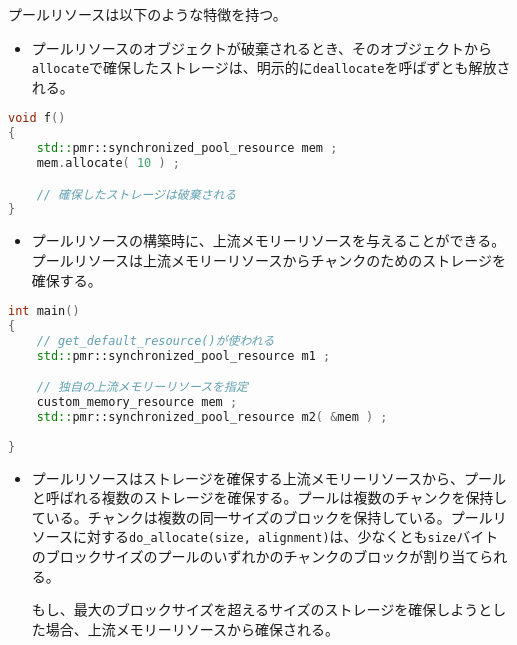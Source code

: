 プールリソースは以下のような特徴を持つ。

\begin{itemize}[leftmargin=*]
\item
  プールリソースのオブジェクトが破棄されるとき、そのオブジェクトから\lstinline!allocate!で確保したストレージは、明示的に\lstinline!deallocate!を呼ばずとも解放される。
\end{itemize}

\begin{lstlisting}[language=C++]
void f()
{
    std::pmr::synchronized_pool_resource mem ;
    mem.allocate( 10 ) ;

    // 確保したストレージは破棄される
}
\end{lstlisting}

\begin{itemize}[leftmargin=*]
\item
  プールリソースの構築時に、上流メモリーリソースを与えることができる。プールリソースは上流メモリーリソースからチャンクのためのストレージを確保する。
\end{itemize}

\begin{lstlisting}[language=C++]
int main()
{
    // get_default_resource()が使われる
    std::pmr::synchronized_pool_resource m1 ;

    // 独自の上流メモリーリソースを指定
    custom_memory_resource mem ;
    std::pmr::synchronized_pool_resource m2( &mem ) ;
    
}
\end{lstlisting}

\begin{itemize}[leftmargin=*]
\item
  プールリソースはストレージを確保する上流メモリーリソースから、プールと呼ばれる複数のストレージを確保する。プールは複数のチャンクを保持している。チャンクは複数の同一サイズのブロックを保持している。プールリソースに対する\lstinline!do_allocate(size, alignment)!は、少なくとも\lstinline!size!バイトのブロックサイズのプールのいずれかのチャンクのブロックが割り当てられる。

  もし、最大のブロックサイズを超えるサイズのストレージを確保しようとした場合、上流メモリーリソースから確保される。
\end{itemize}

